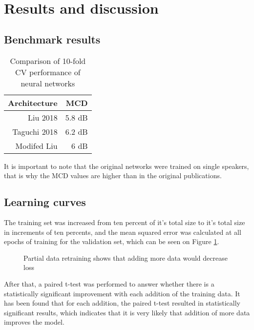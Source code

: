 \documentclass[a4paper]{article}
\begin{document}
\section{Results and discussion}

\subsection{Benchmark results}
\begin{table}[th]
  \caption{Comparison of 10-fold CV performance of neural networks}
  \label{tab:example}
  \centering
  \begin{tabular}{ r r }
    \toprule
    \textbf{Architecture} & \textbf{MCD} \\
    \midrule
    Liu 2018 & 5.8 dB \\
    Taguchi 2018 & 6.2 dB               \\
    Modifed Liu & 6 dB               \\
    \bottomrule
  \end{tabular}
  
\end{table}

It is important to note that the original networks were trained on
single speakers, that is why the MCD values are higher than in the
original publications.


\subsection{Learning curves}

The training set was increased from ten percent of it's total size to it's
total size in increments of ten percents, and the mean squared error
was calculated at all epochs of training for the validation set, which
can be seen on Figure \ref{learning_curve}.

\begin{figure}[t]
  \begin{center}
    \scalebox{0.50}{}
    \caption{Partial data retraining shows that adding more data would
      decrease loss}
      \label{learning_curve}
\end{center}
\end{figure}


After that, a paired t-test was performed to answer whether there is
a statistically significant improvement with each addition of the training data.
It has been found that for each addition, the paired t-test resulted in statistically
significant results, which indicates that it is very likely that addition
of more data improves the model.
\end{document}
